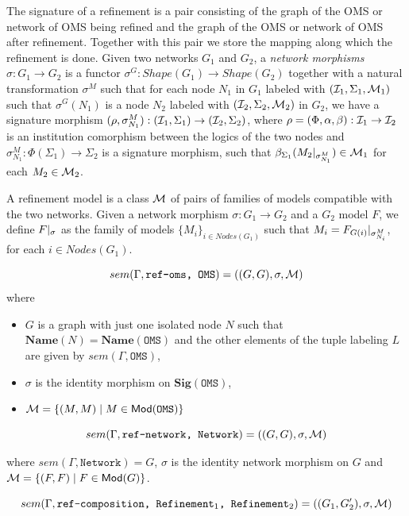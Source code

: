 \documentclass[10pt,fleqn,%
\ifpretendfinal
final%
\else
draft%
\fi,
]{scrreprt}
\newcommand*{\syntax}[1]{\texttt{#1}}
\newcommand{\Sig}{\mathbf{Sig}}
\newcommand{\Name}{\ensuremath{\mathbf{Name}}}
\newcommand{\semdom}[1]{
\begin{center}
\fbox{$#1$}
\end{center}
}
\begin{document}

\semdom{sem(\Gamma, \syntax{Refinement}) = ((G_1, G_2), \sigma, \cM)}

The signature of a refinement is a pair consisting of the graph of the
OMS or network of OMS being refined and the 
graph of the OMS or network of OMS after refinement. Together with this pair
we store the mapping along which the refinement is done. 
Given two networks $G_1$ and $G_2$, a \emph{network morphisms} 
$\sigma : G_1\to G_2$ is a 
functor $\sigma^G: Shape(G_1)\to Shape(G_2)$ 
together with a natural transformation $\sigma^M$ such that
for each node $N_1$ in $G_1$ labeled with $({\cal I}_1, \Sigma_1, {\cal M}_1)$
such that $\sigma^G(N_1)$ is a node $N_2$ labeled with $({\cal I}_2,\Sigma_2,{\cal M}_2)$ in $G_2$,
we have a signature morphism $(\rho,\sigma^M_{N_1}) : ({\cal I}_1, \Sigma_1) \to ({\cal I}_2, \Sigma_2)$,
where $\rho = (\Phi, \alpha, \beta) : {\cal I}_1 \to {\cal I}_2$ is an institution comorphism between the logics of the two nodes and
$\sigma^M_{N_1} : \Phi(\Sigma_1) \to \Sigma_2$ is a signature morphism,
such that $\beta_{\Sigma_1}(M_2|_{\sigma^M_{N_1}}) \in {\cal M}_1$ for each $M_2 \in  {\cal M}_2$.

A refinement model is a class ${\cal M}$ 
of pairs of families of models compatible with the two networks. 
Given a network morphism $\sigma:G_1\to G_2$ and a $G_2$ model $F$, 
we define $F|_{\sigma}$ as the family of models 
$\{M_i\}_{i\in Nodes(G_1)}$ such that
$M_i = F_{G(i)}|_{\sigma^M_{N_i}}$, for each $i\in Nodes(G_1)$.

$$sem(\Gamma, \syntax{ref-oms, OMS}) = 
   ((G, G), \sigma, \cM) $$
  \noindent where 
  \begin{itemize}
  \item $G$ is a graph with just one isolated node $N$
  such that $\Name(N) = \Name(\syntax{OMS})$
  and the other elements of the tuple labeling
  $L$ are given by $sem(\Gamma,\syntax{OMS})$,
  \item $\sigma$ is the identity morphism on 
  $\Sig(\syntax{OMS})$,  
  \item $\cM = \{(M, M) \mid M \in \Mod(\syntax{OMS})\}$
  \end{itemize}
$$sem(\Gamma, \syntax{ref-network, Network}) = ((G, G), \sigma, \cM)$$

\noindent 
where $sem(\Gamma, \syntax{Network}) = G$,
$\sigma$ is the identity network morphism on $G$
and 
${\cal M} = \{ (F, F) \mid F \in \mathsf{Mod}(G)\}$.

$$sem(\Gamma, \syntax{ref-composition, Refinement$_1$, Refinement$_2$}) = 
((G_1, G'_2), \sigma, \cM)$$
\end{document}
